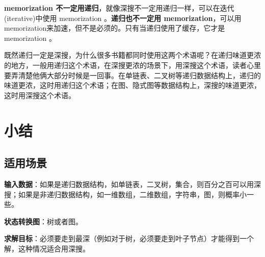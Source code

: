 	\textbf{memorization 不一定用递归}，就像深搜不一定用递归一样，可以在迭代(iterative)中使用 memorization 。\textbf{递归也不一定用 
	memorization}，可以用memorization来加速，但不是必须的。只有当递归使用了缓存，它才是 memorization 。
	
	既然递归一定是深搜，为什么很多书籍都同时使用这两个术语呢？在递归味道更浓的地方，一般用递归这个术语，在深搜更浓的场景下，用深搜这个术语，读者心里要弄清楚他俩大部分时候是一回事。在单链表、二叉树等递归数据结构上，递归的味道更浓，这时用递归这个术语；在图、隐式图等数据结构上，深搜的味道更浓，这时用深搜这个术语。


\section{小结} %
\label{sec:dfs-template}


\subsection{适用场景}

\textbf{输入数据}：如果是递归数据结构，如单链表，二叉树，集合，则百分之百可以用深搜；如果是非递归数据结构，如一维数组，二维数组，字符串，图，则概率小一些。

\textbf{状态转换图}：树或者图。

\textbf{求解目标}：必须要走到最深（例如对于树，必须要走到叶子节点）才能得到一个解，这种情况适合用深搜。



